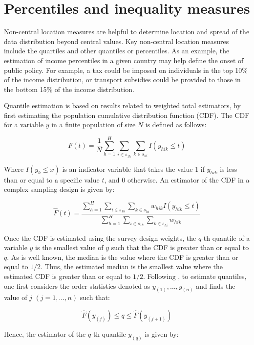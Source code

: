 \documentclass[
  12pt,
]{book}
\begin{document}
\hypertarget{percentiles-and-inequality-measures}{%
\section{Percentiles and inequality measures}\label{percentiles-and-inequality-measures}}

Non-central location measures are helpful to determine location and spread of the data distribution beyond central values. Key non-central location measures include the quartiles and other quantiles or percentiles. As an example, the estimation of income percentiles in a given country may help define the onset of public policy. For example, a tax could be imposed on individuals in the top 10\% of the income distribution, or transport subsidies could be provided to those in the bottom 15\% of the income distribution.

Quantile estimation is based on results related to weighted total estimators, by first estimating the population cumulative distribution function (CDF). The CDF for a variable \(y\) in a finite population of size \(N\) is defined as follows:

\[
F(t) = \frac{1}{N}\sum_{h=1}^{H}\sum_{i \in s_{1h}} \sum_{ k \in s_{hi}}  I(y_{hik} \leq t) 
\]

Where \(I(y_k \leq x)\) is an indicator variable that takes the value 1 if \(y_{hik}\) is less than or equal to a specific value \(t\), and 0 otherwise. An estimator of the CDF in a complex sampling design is given by:

\[
\widehat{F}(t) = \frac{\sum_{h=1}^{H}\sum_{i \in s_{1h}} \sum_{ k \in s_{hi}} w_{hik} I(y_{hik}\leq t)}{\sum_{h=1}^{H}\sum_{i \in s_{1h}} \sum_{ k \in s_{hi}} w_{hik}}
\]

Once the CDF is estimated using the survey design weights, the \(q\)-th quantile of a variable \(y\) is the smallest value of \(y\) such that the CDF is greater than or equal to \(q\). As is well known, the median is the value where the CDF is greater than or equal to \(1/2\). Thus, the estimated median is the smallest value where the estimated CDF is greater than or equal to \(1/2\). Following \citet{Heeringa2017}, to estimate quantiles, one first considers the order statistics denoted as \(y_{(1)}, \ldots, y_{(n)}\) and finds the value of \(j\) \((j=1, \ldots, n)\) such that:

\[
\widehat{F}(y_{(j)}) \leq q\leq\widehat{F}(y_{(j+1)})
\]

Hence, the estimator of the \(q\)-th quantile \(y_{(q)}\) is given by:
\end{document}
